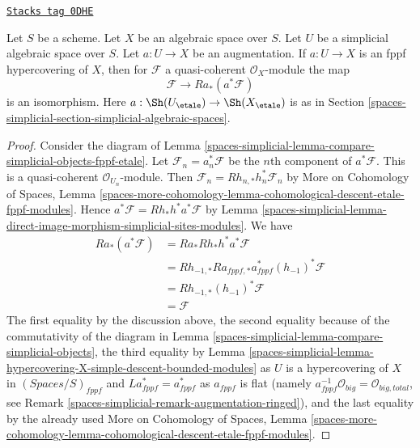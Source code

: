 \begin{lemma}
\label{spaces-simplicial-lemma-cohomological-descent-qcoh-for-fppf-hypercovering}
\href{https://stacks.math.columbia.edu/tag/0DHE}{\texttt{Stacks tag 0DHE}}

Let $S$ be a scheme. Let $X$ be an algebraic space over $S$.
Let $U$ be a simplicial algebraic space over $S$. Let $a : U \to X$
be an augmentation. If $a : U \to X$ is an fppf hypercovering of $X$,
then for $\mathcal{F}$ a quasi-coherent $\mathcal{O}_X$-module
the map
$$
\mathcal{F} \to Ra_*(a^*\mathcal{F})
$$
is an isomorphism. Here $a : \Sh(U_\etale) \to \Sh(X_\etale)$
is as in Section \ref{spaces-simplicial-section-simplicial-algebraic-spaces}.
\end{lemma}

\begin{proof}
Consider the diagram of Lemma \ref{spaces-simplicial-lemma-compare-simplicial-objects-fppf-etale}.
Let $\mathcal{F}_n = a_n^*\mathcal{F}$ be the $n$th component of
$a^*\mathcal{F}$. This is a quasi-coherent $\mathcal{O}_{U_n}$-module.
Then $\mathcal{F}_n = Rh_{n, *}h_n^*\mathcal{F}_n$
by More on Cohomology of Spaces, Lemma
\ref{spaces-more-cohomology-lemma-cohomological-descent-etale-fppf-modules}.
Hence $a^*\mathcal{F} = Rh_*h^*a^*\mathcal{F}$ by
Lemma \ref{spaces-simplicial-lemma-direct-image-morphism-simplicial-sites-modules}.
We have
\begin{align*}
Ra_*(a^*\mathcal{F})
& =
Ra_*Rh_*h^*a^*\mathcal{F} \\
& =
Rh_{-1, *}Ra_{fppf, *}a_{fppf}^*(h_{-1})^*\mathcal{F} \\
& =
Rh_{-1, *}(h_{-1})^*\mathcal{F} \\
& =
\mathcal{F}
\end{align*}
The first equality by the discussion above, the second equality
because of the commutativity of the diagram in
Lemma \ref{spaces-simplicial-lemma-compare-simplicial-objects}, the third equality by
Lemma \ref{spaces-simplicial-lemma-hypercovering-X-simple-descent-bounded-modules}
as $U$ is a hypercovering of $X$ in $(\textit{Spaces}/S)_{fppf}$
and $La_{fppf}^* = a_{fppf}^*$ as $a_{fppf}$ is flat
(namely $a_{fppf}^{-1}\mathcal{O}_{big} = \mathcal{O}_{big, total}$,
see Remark \ref{spaces-simplicial-remark-augmentation-ringed}), and
the last equality by the already used
More on Cohomology of Spaces, Lemma
\ref{spaces-more-cohomology-lemma-cohomological-descent-etale-fppf-modules}.
\end{proof}

